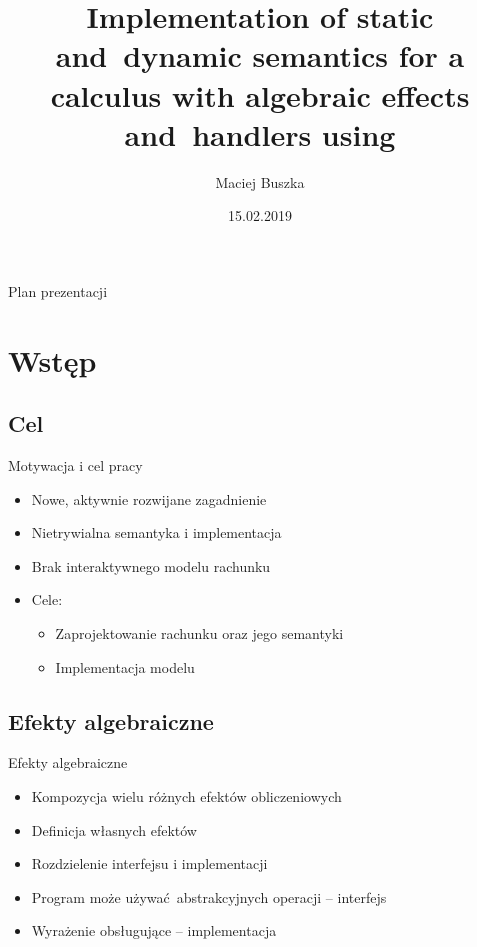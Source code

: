 \documentclass{beamer}
\title[A calculus with algebraic effects and~handlers]{Implementation of static and~dynamic semantics for a calculus with algebraic effects and~handlers using \Redex}
\author{Maciej Buszka}
\institute{Instytut Informatyki UWr}
\date{15.02.2019}
\begin{document}
\begin{frame}
  \titlepage
\end{frame}


\begin{frame}{Plan prezentacji}
  \tableofcontents
\end{frame}

\section{Wstęp}
\subsection{Cel}
\begin{frame}{Motywacja i cel pracy}
  \begin{itemize}
    \item Nowe, aktywnie rozwijane zagadnienie
    \pause
    \item Nietrywialna semantyka i implementacja
    \pause
    \item Brak interaktywnego modelu rachunku
    \pause
    \item Cele:
    \begin{itemize}
      \pause
      \item Zaprojektowanie rachunku oraz jego semantyki
      \pause
      \item Implementacja modelu
    \end{itemize}
  \end{itemize}
\end{frame}

\subsection{Efekty algebraiczne}
\begin{frame}{Efekty algebraiczne}
  \begin{itemize}
    \item Kompozycja wielu różnych efektów obliczeniowych
    \pause
    \item Definicja własnych efektów
    \pause
    \item Rozdzielenie interfejsu i implementacji
    \pause
    \item Program może używać abstrakcyjnych operacji -- interfejs
    \pause
    \item Wyrażenie obsługujące -- implementacja
  \end{itemize}
\end{frame}
\end{document}
